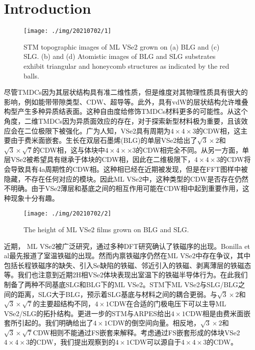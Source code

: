 \documentclass[reprint, aps, prb, showkeys]{revtex4-2}
\begin{document}
\section{Introduction}
\begin{figure}[t]
    \texttt{[image: ./img/20210702/1]}
    \caption{\label{fig:STM} 
    STM topographic images of ML VSe2 grown on (a) BLG and (c) SLG. (b) and (d) Atomistic images of BLG and SLG substrates exhibit triangular and honeycomb structures as indicated by the red balls.
    }
\end{figure}
尽管TMDCs因为其层状结构具有准二维性质，但是维度对其物理性质具有很大的影响，例如能带带隙类型、CDW、超导等。此外，具有vdW的层状结构允许堆叠构型产生多种异质结表面。这种自由度给修饰TMDCs材料更多的可能性。从这个角度，二维TMDCs因为异质面效应的存在，对于探索新型材料极为重要，且该效应会在二位极限下被强化。广为人知，VSe2具有周期为$4 \times 4 \times 3$的CDW相，这主要由于费米面嵌套。生长在双层石墨烯(BLG)的单层VSe2给出了$\sqrt{3} \times 2$和$\sqrt{3} \times \sqrt{7}$的CDW相，这与体块中$4 \times 4 \times \times 3$的CDW相完全不同。从另一方面，单层VSe2被希望具有继承于体块的CDW相，因此在二维极限下，$4 \times 4 \times 3$的CDW将会导致具有4a周期性的CDW相。这种相已经在近期被发现，但是在FFT图样中被隐藏，不存在任何对应的模块。因此ML VSe2中，这种类型的CDW是否存在仍然不明确。由于VSe2薄层和基底之间的相互作用可能在CDW相中起到重要作用，这种现象十分有趣。
\begin{figure*}[t]
    \texttt{[image: ./img/20210702/2]}
    \caption{\label{fig:height} 
    The height of ML VSe2 films grown on BLG and SLG.
    }
\end{figure*}

近期， ML VSe2被广泛研究，通过多种DFT研究确认了铁磁序的出现。Bonilla et al最先报道了室温铁磁的出现。然而内禀铁磁序仍然在ML VSe2中存在争议，其中包括长程铁磁序的缺失、引入Se缺陷的铁磁、邻近引入的铁磁、剥离薄层的铁磁态等。我们也注意到近期2H相VSe2体块表现出室温下的铁磁半导体行为。在此我们制备了两种不同基底SLG和BLG下的ML VSe2。STM下ML VSe2与SLG/BLG之间的距离，SLG大于BLG，预示着SLG基底与材料之间的耦合更弱。与$\sqrt{3} \times 2$和$\sqrt{3} \times \sqrt{7}$的主要超结构不同，$4 \times 1$CDW在合适的门极电压下可以主导ML VSe2/SLG的拓扑结构。更进一步的STM与ARPES给出$4 \times 1$CDW相是由费米面嵌套所引起的。我们明确给出了$4 \times 1$CDW的倒空间向量。相反地，$\sqrt{3} \times 2$和$\sqrt{3} \times \sqrt{7}$CDW相则不能通过FS嵌套来解释。考虑通过FS嵌套形成的体块VSe2$4 \times 4 \times 3$的CDW，我们提出观察到的$4 \times 1$CDW可以源自于$4 \times 4 \times 3$的CDW。
\end{document}
